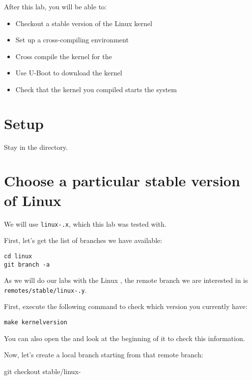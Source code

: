 
After this lab, you will be able to:
\begin{itemize}
\item Checkout a stable version of the Linux kernel
\item Set up a cross-compiling environment
\item Cross compile the kernel for the \labboarddescription
\item Use U-Boot to download the kernel
\item Check that the kernel you compiled starts the system
\end{itemize}

\section{Setup}

Stay in the  directory.

\section{Choose a particular stable version of Linux}

We will use \texttt{linux-\workingkernel.x},
which this lab was tested with.

First, let's get the list of branches we have available:

\begin{verbatim}
cd linux
git branch -a
\end{verbatim}

As we will do our labs with the Linux \workingkernel,
the remote branch we are interested in is\\%
\texttt{remotes/stable/linux-\workingkernel.y}.

First, execute the following command to check which version you
currently have:

\begin{verbatim}
make kernelversion
\end{verbatim}

You can also open the  and look at the beginning of it
to check this information.

Now, let's create a local branch starting from that remote branch:
\begin{bashinput}
git checkout stable/linux-%
\end{bashinput}

